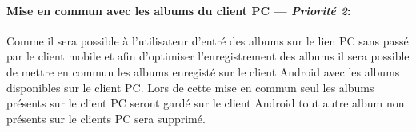 \paragraph{Mise en commun avec les albums du client PC ---  \textit{Priorité 2}:} 
Comme il sera possible à l'utilisateur d'entré des albums sur le lien PC sans passé par le client mobile et afin d'optimiser l'enregistrement des albums il sera possible de mettre en commun les albums enregisté sur le client Android avec les albums disponibles sur le client PC.
Lors de cette mise en commun seul les albums présents sur le client PC seront gardé sur le client Android tout autre album non présents sur le clients PC sera supprimé.  

